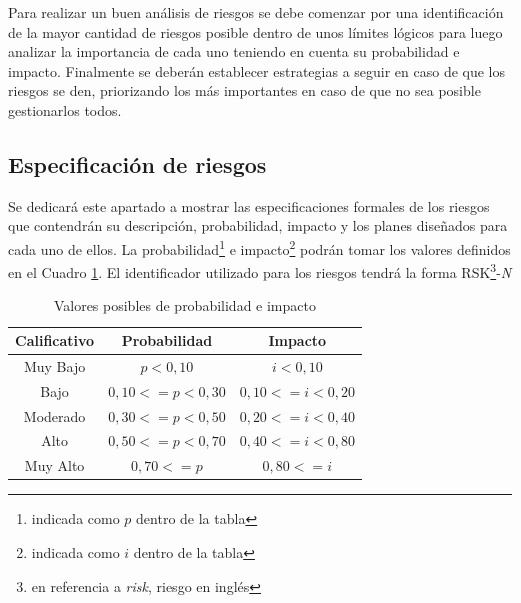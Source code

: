Para realizar un buen análisis de riesgos se debe comenzar por una identificación de la mayor cantidad de riesgos posible dentro de unos límites lógicos para luego analizar la importancia de cada uno teniendo en cuenta su probabilidad e impacto. Finalmente se deberán establecer estrategias a seguir en caso de que los riesgos se den, priorizando los más importantes en caso de que no sea posible gestionarlos todos.

\subsection{Especificación de riesgos}

Se dedicará este apartado a mostrar las especificaciones formales de los riesgos que contendrán su descripción, probabilidad, impacto y los planes diseñados para cada uno de ellos. La probabilidad\footnote{indicada como $p$ dentro de la tabla}  e impacto\footnote{indicada como $i$ dentro de la tabla} podrán tomar los valores definidos en el Cuadro \ref{tab:probabilidad_impacto}. El identificador utilizado para los riesgos tendrá la forma RSK\footnote{en referencia a \textit{risk}, riesgo en inglés}-\textit{N}


\begin{table}
	\begin{center}
		\caption{Valores posibles de probabilidad e impacto}
		\label{tab:probabilidad_impacto}
	\begin{tabular}{ | c | c | c | } 
		\hline
		
		\textbf{Calificativo} &
		\textbf{Probabilidad}&
		\textbf{Impacto}\\
		
		\hline
		Muy Bajo 
		&
		$p<0,10$
		&
		$i<0,10$
		\\ 
		
		\hline
		Bajo 
		&
		$0,10<=p<0,30$
		&
		$0,10<=i<0,20$
		\\ 
		
		\hline
		Moderado 
		&
		$0,30<=p<0,50$
		&
		$0,20<=i<0,40$
		\\ 
		
		\hline
		Alto 
		&
		$0,50<=p<0,70$
		&
		$0,40<=i<0,80$
		\\ 
		
		\hline
		Muy Alto 
		&
		$0,70<=p$
		&
		$0,80<=i$
		\\ 
		
		
		\hline
	\end{tabular}
\end{center}
\end{table}

